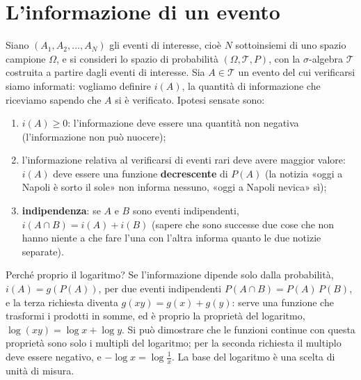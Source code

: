 \section{L'informazione di un evento}

Siano $(A_1, A_2, \ldots, A_N)$ gli eventi di interesse, cioè $N$ sottoinsiemi di uno spazio campione $\Omega$, e si
consideri lo spazio di probabilità $(\Omega, \mathcal{T}, P)$, con la $\sigma$-algebra $\mathcal{T}$ costruita a
partire dagli eventi di interesse. Sia $A \in \mathcal{T}$ un evento del cui verificarsi siamo informati: vogliamo
definire $i(A)$, la quantità di informazione che riceviamo sapendo che $A$ si è verificato. Ipotesi sensate sono:
\begin{enumerate}
  \item $i(A) \geq 0$: l'informazione deve essere una quantità non negativa (l'informazione non può nuocere);
  \item l'informazione relativa al verificarsi di eventi rari deve avere maggior valore: $i(A)$ deve essere una
        funzione \textbf{decrescente} di $P(A)$ (la notizia «oggi a Napoli è sorto il sole» non informa nessuno, «oggi a
        Napoli nevica» sì);
  \item \textbf{indipendenza}: se $A$ e $B$ sono eventi indipendenti, $i(A \cap B) = i(A) + i(B)$ (sapere che sono
        successe due cose che non hanno niente a che fare l'una con l'altra informa quanto le due notizie separate).
\end{enumerate}


Perché proprio il logaritmo? Se l'informazione dipende solo dalla probabilità, $i(A) = g(P(A))$, per due eventi
indipendenti $P(A \cap B) = P(A)\,P(B)$, e la terza richiesta diventa $g(xy) = g(x) + g(y)$: serve una funzione che
trasformi i prodotti in somme, ed è proprio la proprietà del logaritmo, $\log(xy) = \log x + \log y$. Si può dimostrare
che le funzioni continue con questa proprietà sono solo i multipli del logaritmo; per la seconda richiesta il multiplo
deve essere negativo, e $-\log x = \log \frac1x$. La base del logaritmo è una scelta di unità di misura.


